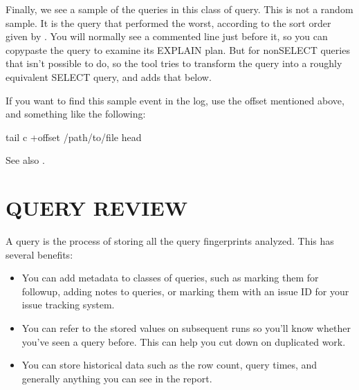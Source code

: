 \documentclass[letterpaper,10pt,english]{sphinxmanual}
\begin{document}
\sphinxAtStartPar
Finally, we see a sample of the queries in this class of query.  This is not a
random sample.  It is the query that performed the worst, according to the sort
order given by {\hyperref[\detokenize{mariadb-query-digest:cmdoption-mariadb-query-digest-order-by}]{}}.  You will normally see a commented 
line just before it, so you can copy\sphinxhyphen{}paste the query to examine its EXPLAIN
plan. But for non\sphinxhyphen{}SELECT queries that isn’t possible to do, so the tool tries to
transform the query into a roughly equivalent SELECT query, and adds that below.

\sphinxAtStartPar
If you want to find this sample event in the log, use the offset mentioned
above, and something like the following:

\begin{sphinxVerbatim}[commandchars=\\\{\}]
tail \PYGZhy{}c +\PYGZlt{}offset\PYGZgt{} /path/to/file  head
\end{sphinxVerbatim}

\sphinxAtStartPar
See also {\hyperref[\detokenize{mariadb-query-digest:cmdoption-mariadb-query-digest-report-format}]{}}.


\section{QUERY REVIEW}
\label{\detokenize{mariadb-query-digest:query-review}}
\sphinxAtStartPar
A query {\hyperref[\detokenize{mariadb-query-digest:cmdoption-mariadb-query-digest-review}]{}} is the process of storing all the query fingerprints
analyzed.  This has several benefits:
\begin{itemize}
\item {} 
\sphinxAtStartPar
You can add metadata to classes of queries, such as marking them for follow\sphinxhyphen{}up,
adding notes to queries, or marking them with an issue ID for your issue
tracking system.

\item {} 
\sphinxAtStartPar
You can refer to the stored values on subsequent runs so you’ll know whether
you’ve seen a query before.  This can help you cut down on duplicated work.

\item {} 
\sphinxAtStartPar
You can store historical data such as the row count, query times, and generally
anything you can see in the report.

\end{itemize}
\end{document}
